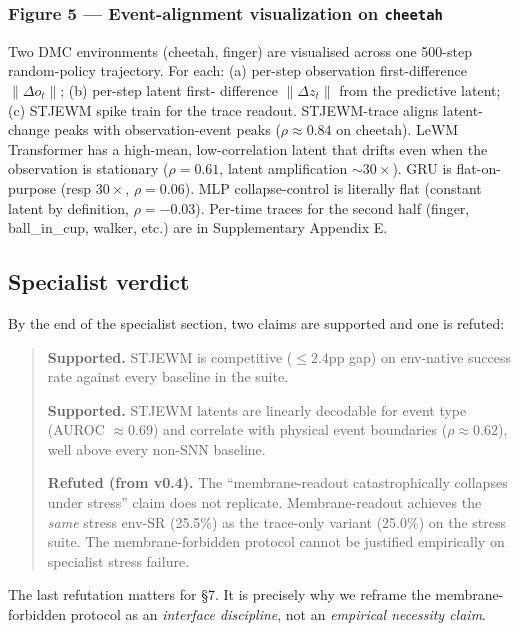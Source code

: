 \documentclass{article}
\begin{document}
\subsubsection*{Figure 5 --- Event-alignment visualization on \texttt{cheetah}}

Two DMC environments (cheetah, finger) are visualised across one
500-step random-policy trajectory. For each: (a) per-step
observation first-difference $\|\Delta o_t\|$; (b) per-step latent first-
difference $\|\Delta z_t\|$ from the predictive latent; (c) STJEWM spike train
for the trace readout. STJEWM-trace aligns latent-change peaks with
observation-event peaks ($\rho \approx 0.84$ on cheetah). LeWM Transformer has
a high-mean, low-correlation latent that drifts even when the
observation is stationary ($\rho = 0.61$, latent amplification $\sim 30\times$). GRU
is flat-on-purpose (resp $30\times$, $\rho = 0.06$). MLP collapse-control is
literally flat (constant latent by definition, $\rho = -0.03$). Per-time
traces for the second half (finger, ball\_in\_cup, walker, etc.) are
in Supplementary Appendix E.

\subsection{Specialist verdict}

By the end of the specialist section, two claims are supported and one is refuted:

\begin{quote}
\textbf{Supported.} STJEWM is competitive ($\leq 2.4$pp gap) on env-native
success rate against every baseline in the suite.

\textbf{Supported.} STJEWM latents are linearly decodable for event
type (AUROC $\approx 0.69$) and correlate with physical event
boundaries ($\rho \approx 0.62$), well above every non-SNN baseline.

\textbf{Refuted (from v0.4).} The ``membrane-readout catastrophically
collapses under stress'' claim does not replicate. Membrane-readout
achieves the \emph{same} stress env-SR (25.5\%) as the trace-only variant
(25.0\%) on the stress suite. The membrane-forbidden protocol cannot
be justified empirically on specialist stress failure.
\end{quote}

The last refutation matters for §7. It is precisely why we reframe the
membrane-forbidden protocol as an \emph{interface discipline}, not an
\emph{empirical necessity claim}.
\end{document}
